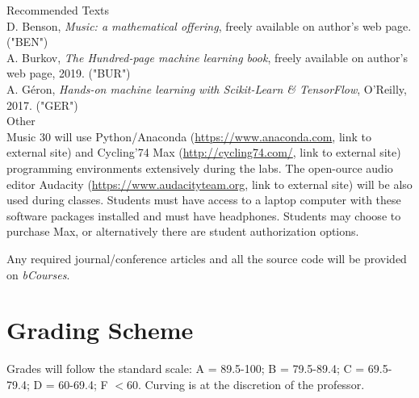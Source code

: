 \documentclass[letterpaper]{inzane_syllabus} %
\begin{document}
{\color{myCOLOR} Recommended Texts}\\
D. Benson, \textit{Music: a mathematical offering}, freely available on author's web page.  ("BEN")\\
A. Burkov, \textit{The Hundred-page machine learning book}, freely available on author’s web page, 2019. ("BUR")\\
A. G\'eron, \textit{Hands-on machine learning with Scikit-Learn \& TensorFlow}, O'Reilly, 2017.  ("GER")\\

{\color{myCOLOR} Other}\\
Music 30 will use Python/Anaconda (\url{https://www.anaconda.com}, link to external site) and Cycling’74 Max (\url{http://cycling74.com/}, link to external site) programming environments extensively during the labs. The open-ource audio editor Audacity (\url{https://www.audacityteam.org}, link to external site) will be also used during classes. Students must have access to a laptop computer with these software packages installed and must have headphones. Students may choose to purchase Max, or alternatively there are student authorization options.

Any required journal/conference articles and all the source code will be provided on \emph{bCourses}. 

\vspace{0.5cm}
\section{Grading Scheme}

\begin{twentyshort}
\end{twentyshort}

Grades will follow the standard scale: A = 89.5-100; B = 79.5-89.4; C = 69.5-79.4; D = 60-69.4; F  $<$60. Curving is at the discretion of the professor. 


\end{document}
